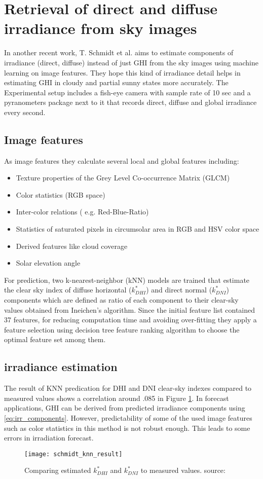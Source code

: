 \section{Retrieval of direct and diffuse irradiance from sky images}
In another recent work, T. Schmidt et al.\cite{tSchmidt15} aims to estimate components of irradiance (direct, diffuse) instead of just GHI from the sky images using machine learning on image features. They hope this kind of irradiance detail helps in estimating GHI in cloudy and partial sunny states more accurately. The Experimental setup includes a fish-eye camera  with sample rate of 10 sec and a pyranometers package next to it that records direct, diffuse and global irradiance every second. 
\subsection{Image features}
As image features they calculate several local and global features including: 
\begin{itemize}
\item Texture properties of the Grey Level Co-occurrence Matrix (GLCM)
\item Color statistics (RGB space)
\item Inter-color relations ( e.g. Red-Blue-Ratio)
\item Statistics of saturated pixels in circumsolar area in RGB and HSV color space
\item Derived features like cloud coverage
\item Solar elevation angle
\end{itemize}
For prediction, two k-nearest-neighbor (kNN) models are trained that estimate the clear sky index of diffuse horizontal ($k^{*}_{DHI}$) and direct normal ($k^{*}_{DNI}$) components which are defined as ratio of each component to their clear-sky values obtained from Ineichen's algorithm\cite{Ineichen}.
Since the initial feature list contained 37 features, for reducing computation time and avoiding over-fitting they apply a feature selection using decision tree feature ranking algorithm to choose the optimal feature set among them. 
\subsection{irradiance estimation}
The result of KNN predication for DHI and DNI clear-sky indexes compared to measured values shows a correlation around .085 in Figure \ref{fig:knn_result_Schmidt}. In forecast applications, GHI can be derived from predicted irradiance components using \ref{eq:irr_components}. However, predictability of some of the used image features such as color statistics in this method is not robust enough. This leads to some errors in irradiation forecast.

\begin{figure}[h]
\caption{Comparing estimated  $k^{*}_{DHI}$ and $k^{*}_{DNI}$ to measured values.  source:\cite{tSchmidt15}}
\label{fig:knn_result_Schmidt}
\texttt{[image: schmidt\_knn\_result]}
\centering
\end{figure} 
 